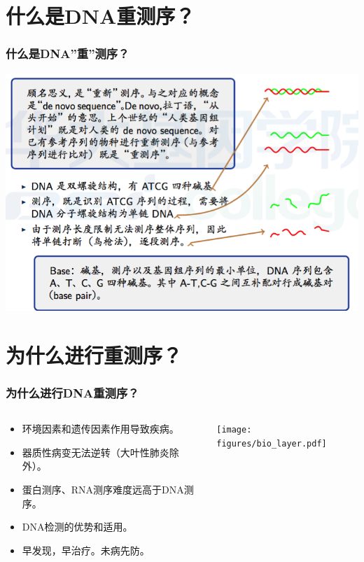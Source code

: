 \documentclass[12pt]{beamer}
\begin{document}
\section{什么是DNA重测序？}
\begin{frame}\frametitle{什么是DNA''重''测序？}
\includegraphics[width=\textwidth]{figures/old_slides/reseq.png}
\end{frame}


\section{为什么进行重测序？}
\begin{frame}\frametitle{为什么进行DNA重测序？}
  \begin{columns}
    \begin{column}{0.5\textwidth}
      \begin{itemize}
      \item 环境因素和遗传因素作用导致疾病。
      \item 器质性病变无法逆转（大叶性肺炎除外）。
      \item 蛋白测序、RNA测序难度远高于DNA测序。
      \item DNA检测的优势和适用。
      \item 早发现，早治疗。未病先防。        
      \end{itemize}
      \end{column}
    \begin{column}{0.5\textwidth}
      \texttt{[image: figures/bio\_layer.pdf]}
      \end{column}
    \end{columns}
  \end{frame}
\end{document}

